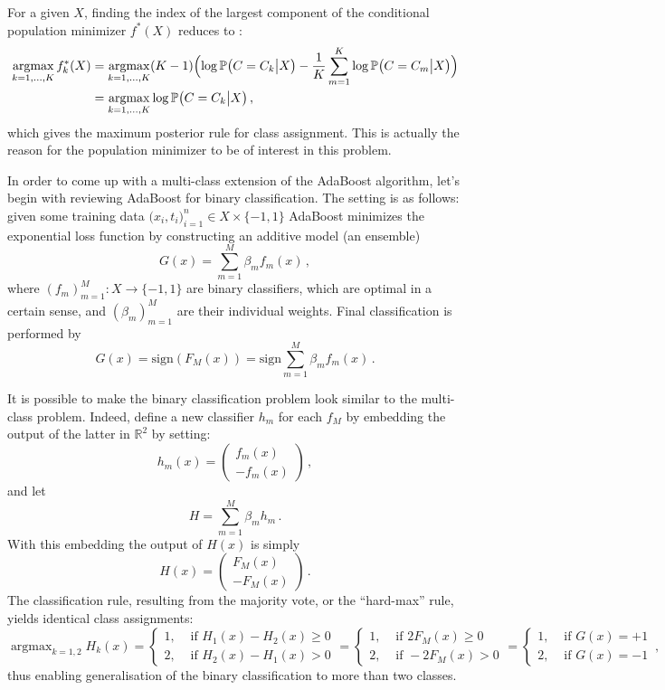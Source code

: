 \documentclass[a4paper]{article}
\newcommand{\Real}{\mathbb{R}}
\newcommand{\pr}{\mathbb{P}}
\newcommand{\argmax}{\mathop{\text{argmax}}}
\begin{document}
For a given $X$, finding the index of the largest component of the conditional population
minimizer $f^*(X)$ reduces to :
\begin{align*}
	\argmax_{k=1,\ldots,K} f^*_k(X)
	&= \argmax_{k=1,\ldots,K} (K-1) \Bigl( \log \pr\bigl( C = C_k \big\vert X \bigr)
		- \frac{1}{K}\sum_{m=1}^K \log \pr\bigl( C = C_m \big\vert X \bigr) \Bigr) \\
	&= \argmax_{k=1,\ldots,K} \log \pr\bigl( C = C_k \big\vert X \bigr) \,,
\end{align*}
which gives the maximum posterior rule for class assignment. This is actually the reason
for the population minimizer to be of interest in this problem.

In order to come up with a multi-class extension of the AdaBoost algorithm, let's begin
with reviewing AdaBoost for binary classification. The setting is as follows: given
some training data $\bigl(x_i,t_i\bigr)_{i=1}^n\in X\times \{-1,1\}$ AdaBoost
minimizes the exponential loss function by constructing an additive model (an ensemble)
\[ G(x) = \sum_{m=1}^M \beta_m f_m(x) \,,\]
where $(f_m)_{m=1}^M:X\to \{-1,1\}$ are binary classifiers, which are optimal in
a certain sense, and $(\beta_m)_{m=1}^M$ are their individual weights. Final classification
is performed by 
\[ G(x) = \text{sign}(F_M(x)) = \text{sign} \sum_{m=1}^M \beta_m f_m(x) \,. \]

It is possible to make the binary classification problem look similar to the multi-class
problem. Indeed, define a new classifier $h_m$ for each $f_M$ by embedding the output of
the latter in $\Real^2$ by setting:
\[ h_m(x) = \begin{pmatrix}f_m(x)\\-f_m(x)\end{pmatrix} \,,\]
and let
\[ H = \sum_{m=1}^M \beta_m h_m \,.\]
With this embedding the output of $H(x)$ is simply
\[ H(x) =\begin{pmatrix}F_M(x)\\ -F_M(x)\end{pmatrix} \,.\]
The classification rule, resulting from the majority vote, or the ``hard-max'' rule,
yields identical class assignments:
\[ \argmax_{k=1,2} H_k(x) = \begin{cases}
	1, &\text{ if } H_1(x) - H_2(x) \geq 0\\
	2, &\text{ if } H_2(x) - H_1(x) > 0
\end{cases} = \begin{cases}
	1, &\text{ if } 2 F_M(x) \geq 0\\
	2, &\text{ if } -2 F_M(x) > 0
\end{cases} = \begin{cases}
	1, &\text{ if } G(x) = +1\\
	2, &\text{ if } G(x) = -1
\end{cases} \,, \]
thus enabling generalisation of the binary classification to more than two classes.
\end{document}
